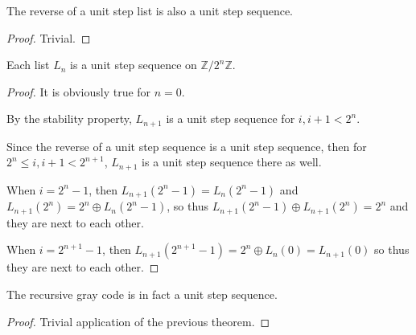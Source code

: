 \begin{lemma}
    \label{thm:reverse_unit_step}
    \leanok

    The reverse of a unit step list is also a unit step sequence.
\end{lemma}

\begin{proof}
    \leanok
    Trivial.
\end{proof}

\begin{theorem}
    \label{thm:list_gray_code_unit_step}
    \leanok

    Each list $L_n$ is a unit step sequence on $\mathbb{Z} / 2^n \mathbb{Z}$.
\end{theorem}

\begin{proof}
    \leanok
    It is obviously true for $n = 0$.

    By the stability property, $L_{n+1}$ is a unit step sequence for $i, i+1 < 2^n$.

    Since the reverse of a unit step sequence is a unit step sequence, then for
    $2^n \le i, i+1 < 2^{n+1}$, $L_{n+1}$ is a unit step sequence there as well.

    When $i = 2^n - 1$, then $L_{n+1}(2^n - 1) = L_{n}(2^n - 1)$ and $L_{n+1}(2^n) = 2^n \oplus L_{n}(2^n - 1)$,
    so thus $L_{n+1}(2^n - 1) \oplus L_{n+1}(2^n) = 2^n$ and they are next to each other.

    When $i = 2^{n+1} - 1$, then $L_{n+1}(2^{n+1} - 1) = 2^n \oplus L_{n}(0) = L_{n+1}(0)$ so thus they are next to each other.
\end{proof}

\begin{theorem}
    \label{thm:recursive_gray_code_unit_step}
    \leanok


    The recursive gray code is in fact a unit step sequence.
\end{theorem}

\begin{proof}
    \leanok
    Trivial application of the previous theorem.
\end{proof}

